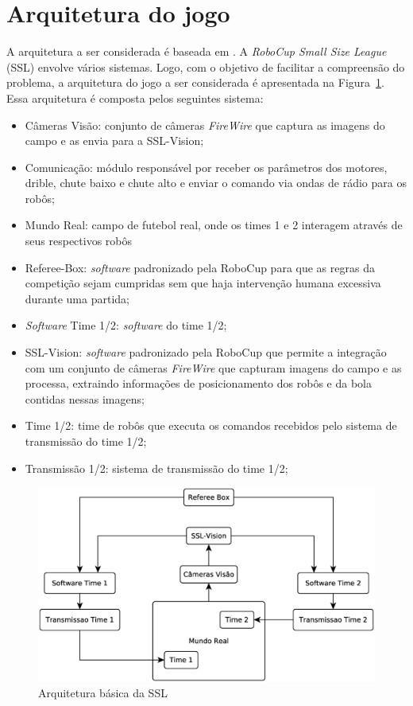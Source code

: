 \section{Arquitetura do jogo}\label{sec:arch_ssl}

A arquitetura a ser considerada é baseada em \cite{felixnavarro}.  A
\textit{RoboCup Small Size League} (SSL) envolve vários sistemas.  Logo, com o
objetivo de facilitar a compreensão do problema, a arquitetura do jogo a ser
considerada é apresentada na Figura~\ref{fig:arquitetura_ssl}. Essa arquitetura
é composta pelos seguintes sistema:

\begin{itemize}
  \item Câmeras Visão: conjunto de câmeras \textit{FireWire} que captura as imagens do
        campo e as envia para a SSL-Vision;
  \item Comunicação: módulo responsável por receber os parâmetros
        dos motores, drible, chute baixo e chute alto e enviar o comando via
        ondas de rádio para os robôs;
  \item Mundo Real: campo de futebol real, onde os times 1 e 2 interagem
        através de seus respectivos robôs
  \item Referee-Box: \textit{software} padronizado pela RoboCup para que as
        regras da competição sejam cumpridas sem que haja intervenção
        humana excessiva durante uma partida;
  \item \textit{Software} Time 1/2: \textit{software} do time 1/2;
  \item SSL-Vision: \textit{software} padronizado pela RoboCup que permite a
        integração com um conjunto de câmeras \textit{FireWire} que capturam
        imagens do campo e as processa, extraindo informações de posicionamento
        dos robôs e da bola contidas nessas imagens;
  \item Time 1/2: time de robôs que executa os comandos recebidos pelo
        sistema de transmissão do time 1/2;
  \item Transmissão 1/2: sistema de transmissão do time 1/2;
\end{itemize}

\begin{figure}[thpb]
  \centering
  \includegraphics[width= 0.8\linewidth]{img/arq_ssl}
  \caption{Arquitetura básica da SSL}\label{fig:arquitetura_ssl}
\end{figure}

